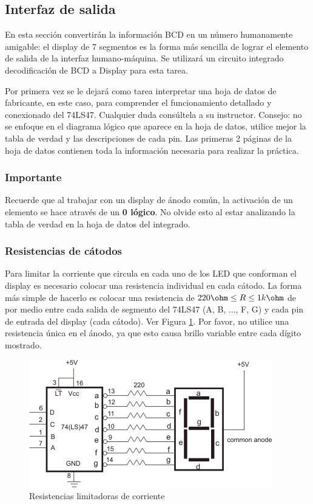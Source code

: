 \subsection{Interfaz de salida}
En esta sección convertirán la información BCD en un número humanamente amigable: el display de 7 segmentos es la forma más sencilla de lograr
el elemento de salida de la interfaz humano-máquina. Se utilizará un circuito integrado decodificación de BCD a Display para esta tarea.

Por primera vez se le dejará como tarea interpretar una hoja de datos de fabricante, en este caso, para comprender el funcionamiento detallado y
conexionado del 74LS47. Cualquier duda consúltela a su instructor. Consejo: no se enfoque en el diagrama lógico que aparece en la hoja de datos,
utilice mejor la tabla de verdad y las descripciones de cada pin. Las primeras 2 páginas de la hoja de datos contienen toda la información necesaria
para realizar la práctica.

\subsubsection*{Importante}
Recuerde que al trabajar con un display de ánodo común, la activación de un elemento se hace através de un \textbf{0 lógico}. No olvide esto
al estar analizando la tabla de verdad en la hoja de datos del integrado.

\subsubsection{Resistencias de cátodos}
Para limitar la corriente que circula en cada uno de los LED que conforman el display es necesario colocar una resistencia individual en cada cátodo.
La forma más simple de hacerlo es colocar una resistencia de $ 220 \ohm \leq R \leq 1 k\ohm$ de por medio entre cada salida de segmento del 74LS47 (A, B, ..., F, G)
y cada pin de entrada del display (cada cátodo). Ver Figura \ref{Fig:Currentlimitingresistors}. Por favor, no utilice una resistencia única en el ánodo, ya que esto causa brillo variable entre cada 
dígito mostrado.

\begin{figure}[H]
    \centering
    \includegraphics[scale=1.0]{images/DisplayResistors.png}
    \caption{Resistencias limitadoras de corriente}
    \label{Fig:Currentlimitingresistors}
\end{figure}

